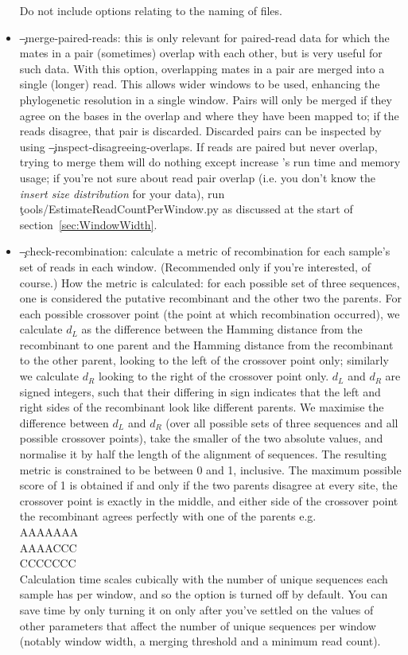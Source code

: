 \begin{itemize}
Do not include options relating to the naming of files.
\item \c{--merge-paired-reads}: this is only relevant for paired-read data for which the mates in a pair
(sometimes) overlap with each other, but is very useful for such data.
With this option, overlapping mates in a pair are merged into a single (longer) read.
This allows wider windows to be used, enhancing the phylogenetic resolution in a single window.
Pairs will only be merged if they agree on the bases in the overlap and where they have been mapped to; if the reads disagree, that pair is discarded.
Discarded pairs can be inspected by using \c{--inspect-disagreeing-overlaps}.
If reads are paired but never overlap, trying to merge them will do nothing except increase \pmt's run time and memory usage; if you're not sure about read pair overlap (i.e. you don't know the {\it insert size distribution} for your data), run \\\c{tools/EstimateReadCountPerWindow.py} as discussed at the start of section~\ref{sec:WindowWidth}.
\item \c{--check-recombination}: calculate a metric of recombination for each sample's set of reads in each window.
(Recommended only if you're interested, of course.)
How the metric is calculated: for each possible set of three sequences, one is considered the putative recombinant and the other two the parents.
For each possible crossover point (the point at which recombination occurred), we calculate $d_L$ as the difference between the Hamming distance from the recombinant to one parent and the Hamming distance from the recombinant to the other parent, looking to the left of the crossover point only; similarly we calculate $d_R$ looking to the right of the crossover point only.
$d_L$ and $d_R$ are signed integers, such that their differing in sign indicates that the left and right sides of the recombinant look like different parents.
We maximise the difference between $d_L$ and $d_R$ (over all possible sets of three sequences and all possible crossover points), take the smaller of the two absolute values, and normalise it by half the length of the alignment of sequences.
The resulting metric is constrained to be between 0 and 1, inclusive.
The maximum possible score of 1 is obtained if and only if the two parents disagree at every site, the crossover point is exactly in the middle, and either side of the crossover point the recombinant agrees perfectly with one of the parents e.g.\\
AAAAAAA\\
AAAACCC\\
CCCCCCC\\
Calculation time scales cubically with the number of unique sequences each sample has per window, and so the option is turned off by default.
You can save time by only turning it on only after you've settled on the values of other parameters that affect the number of unique sequences per window (notably window width, a merging threshold and a minimum read count).
\end{itemize}

